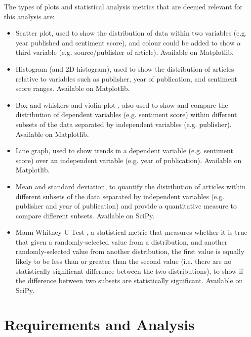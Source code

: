 \documentclass{report}
\begin{document}
The types of plots and statistical analysis metrics that are deemed relevant for this analysis are:
\begin{itemize}
	\item Scatter plot, used to show the distribution of data within two variables (e.g. year published and sentiment score), and colour could be added to show a third variable (e.g. source/publisher of article).
		Available on Matplotlib.
	\item Histogram (and 2D histogram), used to show the distribution of articles relative to variables such as publisher, year of publication, and sentiment score ranges. 
		Available on Matplotlib.
	\item Box-and-whiskers \cite{tukey1977exploratory} and violin plot \cite{hintze1998violin}, also used to show and compare the distribution of dependent variables (e.g. sentiment score) within different subsets of the data separated by independent variables (e.g. publisher).
		Available on Matplotlib.
	\item Line graph, used to show trends in a dependent variable (e.g. sentiment score) over an independent variable (e.g. year of publication).
		Available on Matplotlib.
	\item Mean and standard deviation, to quantify the distribution of articles within different subsets of the data separated by independent variables (e.g. publisher and year of publication) and provide a quantitative measure to compare different subsets.
		Available on SciPy.
	\item Mann-Whitney U Test \cite{mann1947test}, a statistical metric that measures whether it is true that given a randomly-selected value from a distribution, and another randomly-selected value from another distribution, the first value is equally likely to be less than or greater than the second value (i.e. there are no statistically significant difference between the two distributions), to show if the difference between two subsets are statistically significant.
		Available on SciPy.
\end{itemize}

\chapter{Requirements and Analysis} \label{Requirements and Analysis}  %

\end{document}
